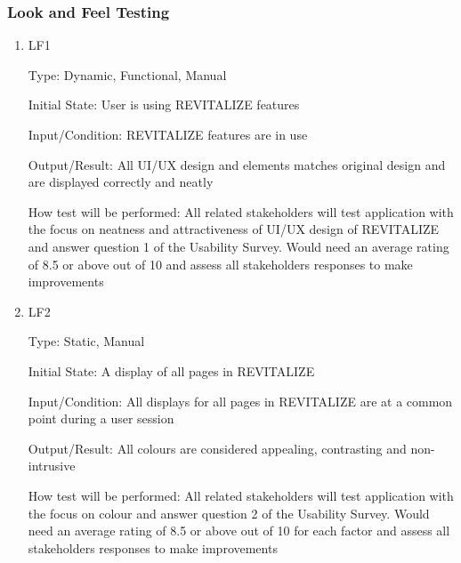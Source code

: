 \documentclass[12pt, titlepage]{article}
\begin{document}


\subsubsection{Look and Feel Testing}

\begin{enumerate}

\item{LF1\\}

Type: Dynamic, Functional, Manual
					
Initial State: User is using REVITALIZE features
					
Input/Condition: REVITALIZE features are in use
					
Output/Result: All UI/UX design and elements matches original design and are displayed correctly and neatly
					
How test will be performed: All related stakeholders will test application with the focus on neatness and attractiveness of UI/UX design of REVITALIZE and answer question 1 of the Usability Survey. Would need an average rating of 8.5 or above out of 10 and assess all stakeholders responses to make improvements
					
\item{LF2\\}

Type: Static, Manual
					
Initial State: A display of all pages in REVITALIZE
					
Input/Condition: All displays for all pages in REVITALIZE are at a common point during a user session
					
Output/Result: All colours are considered appealing, contrasting and non-intrusive
					
How test will be performed: All related stakeholders will test application with the focus on colour and answer question 2 of the Usability Survey. Would need an average rating of 8.5 or above out of 10 for each factor and assess all stakeholders responses to make improvements

\end{enumerate}
\end{document}
